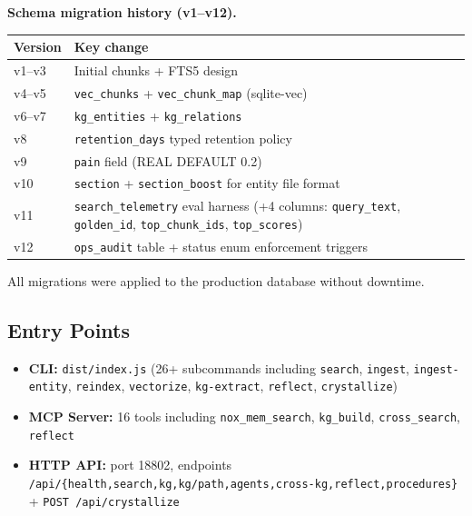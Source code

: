 \documentclass{article}
\begin{document}
\textbf{Schema migration history (v1--v12).}

\begin{table}[h]
  \centering
  \begin{tabular}{ll}
    \toprule
    Version & Key change \\
    \midrule
    v1--v3 & Initial chunks + FTS5 design \\
    v4--v5 & \texttt{vec\_chunks} + \texttt{vec\_chunk\_map} (sqlite-vec) \\
    v6--v7 & \texttt{kg\_entities} + \texttt{kg\_relations} \\
    v8     & \texttt{retention\_days} typed retention policy \\
    v9     & \texttt{pain} field (REAL DEFAULT 0.2) \\
    v10    & \texttt{section} + \texttt{section\_boost} for entity file format \\
    v11    & \texttt{search\_telemetry} eval harness (+4 columns: \texttt{query\_text},
             \texttt{golden\_id}, \texttt{top\_chunk\_ids}, \texttt{top\_scores}) \\
    v12    & \texttt{ops\_audit} table + status enum enforcement triggers \\
    \bottomrule
  \end{tabular}
\end{table}

All migrations were applied to the production database without downtime.

\subsection{Entry Points}

\begin{itemize}
  \item \textbf{CLI:} \texttt{dist/index.js} (26+ subcommands including \texttt{search},
    \texttt{ingest}, \texttt{ingest-entity}, \texttt{reindex}, \texttt{vectorize},
    \texttt{kg-extract}, \texttt{reflect}, \texttt{crystallize})
  \item \textbf{MCP Server:} 16 tools including \texttt{nox\_mem\_search},
    \texttt{kg\_build}, \texttt{cross\_search}, \texttt{reflect}
  \item \textbf{HTTP API:} port 18802, endpoints
    \texttt{/api/\{health,search,kg,kg/path,agents,cross-kg,reflect,procedures\}}
    + \texttt{POST /api/crystallize}
\end{itemize}

\end{document}
